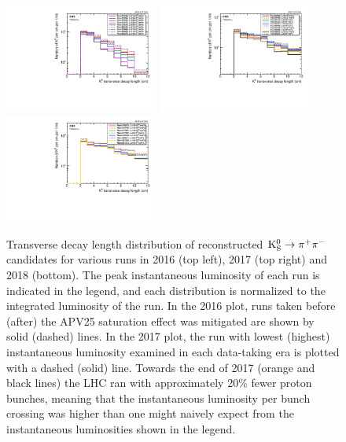 \begin{figure}
\centering
\includegraphics[width=0.45\textwidth]{figures/tracking_eff/2016/k0.pdf}
\includegraphics[width=0.45\textwidth]{figures/tracking_eff/2017/k0.pdf}
\includegraphics[width=0.45\textwidth]{figures/tracking_eff/2018/k0.pdf}
\caption{Transverse decay length distribution of reconstructed $\mathrm{K^0_S}\to\pi^+\pi^-$ candidates for various runs in 2016 (top left), 2017 (top right) and 2018 (bottom). The peak instantaneous luminosity of each run is indicated in the legend, and each distribution is normalized to the integrated luminosity of the run. In the 2016 plot, runs taken before (after) the APV25 saturation effect was mitigated are shown by solid (dashed) lines. In the 2017 plot, the run with lowest (highest) instantaneous luminosity examined in each data-taking era is plotted with a dashed (solid) line. Towards the end of 2017 (orange and black lines) the LHC ran with approximately 20\% fewer proton bunches, meaning that the instantaneous luminosity per bunch crossing was higher than one might naively expect from the instantaneous luminosities shown in the legend.}
\label{k0_tracking_eff}
\end{figure}